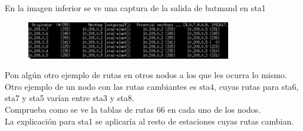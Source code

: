 \documentclass[12pt, a4paper]{report}
\begin{document}
\begin{enumerate}
	En la imagen inferior se ve una captura de la salida de batmand en sta1
	\begin{figure}[H]
		\centering
		\includegraphics[width=0.8\textwidth]{ej2.2_1}
	\end{figure}
	
	Pon algún otro ejemplo de rutas en otros nodos a los que les ocurra lo mismo.\\
	
	Otro ejemplo de un nodo con las rutas cambiantes es sta4, cuyas rutas para sta6, sta7 y sta5 varían entre sta3 y sta8.\\
	
	Comprueba como se ve la tablas de rutas 66 en cada uno de los nodos.\\
	
	La explicación para sta1 se aplicaría al resto de estaciones cuyas rutas cambian.\\


\end{enumerate}
\end{document}
